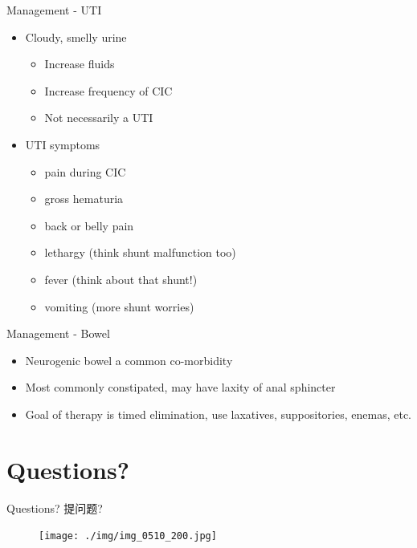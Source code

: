 \begin{frame}{Management - UTI}

\begin{itemize}
\itemsep1pt\parskip0pt
\item
  Cloudy, smelly urine

  \begin{itemize}
  \itemsep1pt\parskip0pt
  \item
    Increase fluids
  \item
    Increase frequency of CIC
  \item
    Not necessarily a UTI
  \end{itemize}
\item
  UTI symptoms

  \begin{itemize}
  \itemsep1pt\parskip0pt
  \item
    pain during CIC
  \item
    gross hematuria
  \item
    back or belly pain
  \item
    lethargy (think shunt malfunction too)
  \item
    fever (think about that shunt!)
  \item
    vomiting (more shunt worries)
  \end{itemize}
\end{itemize}

\end{frame}

\begin{frame}{Management - Bowel}

\begin{itemize}
\itemsep1pt\parskip0pt
\item
  Neurogenic bowel a common co-morbidity
\item
  Most commonly constipated, may have laxity of anal sphincter
\item
  Goal of therapy is timed elimination, use laxatives, suppositories,
  enemas, etc.
\end{itemize}

\end{frame}

\section{Questions?}\label{questions}

\begin{frame}{Questions? 提问题?}

\begin{figure}[htbp]
\centering
\texttt{[image: ./img/img\_0510\_200.jpg]}
\caption{}
\end{figure}

\end{frame}
